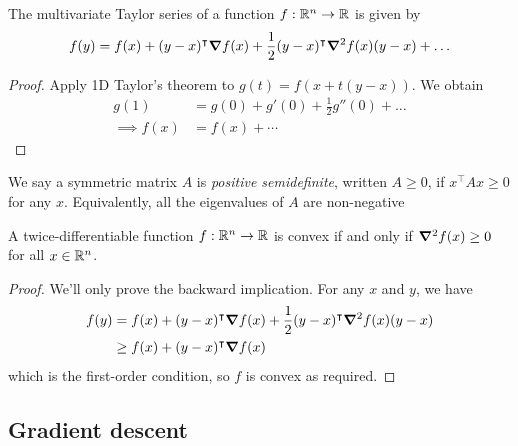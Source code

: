 \documentclass{../template/note}
\begin{document}
    \begin{proposition}
        The multivariate Taylor series of a function $f: \mathbb R^n \to \mathbb R$ is given by
        \begin{align*}
            f(y) = f(x) + (y-x)^\intercal \grad f(x) + \frac 1 2 (y-x)^\intercal \grad^2 f(x) (y-x) + \dots
        \end{align*}
    \end{proposition}
    
    \begin{proof}
        Apply 1D Taylor's theorem to $g(t) = f(x + t(y-x))$. We obtain
        \begin{align*}
            g(1) &= g(0) + g'(0) + \frac 1 2 g''(0) + \dots \\
            \implies f(x) &= f(x) + \cdots
        \end{align*}
    \end{proof}

    \begin{definition}
        We say a symmetric matrix $A$ is \emph{positive semidefinite}, written $A \geq 0$, if $x^\intercal A x \geq 0$ for any $x$. Equivalently, all the eigenvalues of $A$ are non-negative
    \end{definition}   
    
    \begin{theorem}
        A twice-differentiable function $f: \mathbb R^n \to \mathbb R$ is convex if and only if $\grad^2 f(x) \geq 0$ for all $x \in \mathbb R^n$.
    \end{theorem}
    
    \begin{proof}
        We'll only prove the backward implication. For any $x$ and $y$, we have
        \begin{align*}
            f(y) &= f(x) + (y-x)^\intercal \grad f(x) + \frac 1 2 (y-x)^\intercal \grad^2 f(x) (y-x) \\
            &\geq f(x) + (y-x)^\intercal \grad f(x)
        \end{align*}
        which is the first-order condition, so $f$ is convex as required.        
    \end{proof}
    

    \subsection{Gradient descent}
\end{document}
